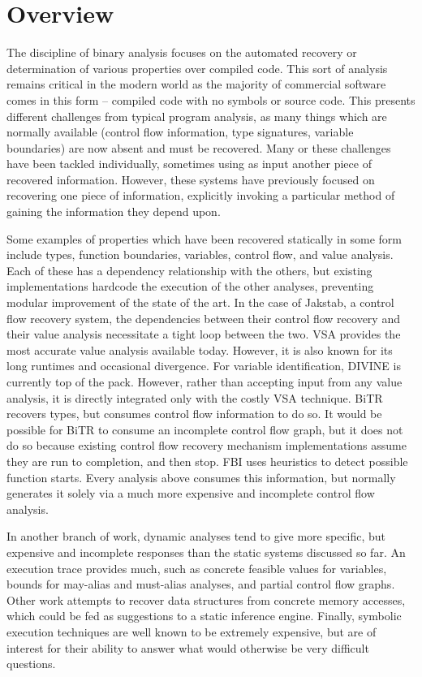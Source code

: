 
\section{Overview}
The discipline of binary analysis focuses on the automated recovery or determination of various properties over compiled code.
This sort of analysis remains critical in the modern world as the majority of commercial software comes in this form -- compiled code with no symbols or source code.
This presents different challenges from typical program analysis, as many things which are normally available (control flow information, type signatures, variable boundaries) are now absent and must be recovered.
Many or these challenges have been tackled individually, sometimes using as input another piece of recovered information.
However, these systems have previously focused on recovering one piece of information, explicitly invoking a particular method of gaining the information they depend upon.

Some examples of properties which have been recovered statically in some form include types, function boundaries, variables, control flow, and value analysis.
Each of these has a dependency relationship with the others, but existing implementations hardcode the execution of the other analyses, preventing modular improvement of the state of the art.
In the case of Jakstab\cite{jakstab}, a control flow recovery system, the dependencies between their control flow recovery and their value analysis necessitate a tight loop between the two.
VSA\cite{vsa} provides the most accurate value analysis available today. However, it is also known for its long runtimes and occasional divergence.
For variable identification, DIVINE\cite{divine} is currently top of the pack. However, rather than accepting input from any value analysis, it is directly integrated only with the costly VSA technique.
BiTR\cite{bitr} recovers types, but consumes control flow information to do so.
It would be possible for BiTR to consume an incomplete control flow graph, but it does not do so because existing control flow recovery mechanism implementations assume they are run to completion, and then stop.
FBI\cite{fbi} uses heuristics to detect possible function starts.
Every analysis above consumes this information, but normally generates it solely via a much more expensive and incomplete control flow analysis.

In another branch of work, dynamic analyses tend to give more specific, but expensive and incomplete responses than the static systems discussed so far.
An execution trace provides much, such as concrete feasible values for variables, bounds for may-alias and must-alias analyses, and partial control flow graphs.
Other work attempts to recover data structures from concrete memory accesses, which could be fed as suggestions to a static inference engine.
Finally, symbolic execution techniques are well known to be extremely expensive, but are of interest for their ability to answer what would otherwise be very difficult questions\cite{mayhem}.


